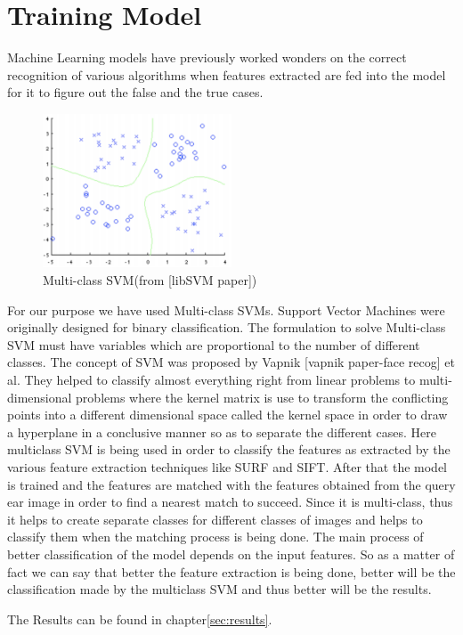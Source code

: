 \section{Training Model} \label{sec:build3} Machine Learning models have previously worked wonders on the correct recognition of various algorithms when features extracted are fed into the model for it to figure out the false and the true cases. 

\begin{figure}[b]
	\begin{center}
		\includegraphics[width=0.5\textwidth]{Figures/Figure10}
	\end{center}
	\caption{Multi-class SVM(from [libSVM paper])}
	\label{fig:Figure10}
\end{figure}


For our purpose we have used Multi-class SVMs. Support Vector Machines were originally designed for binary classification. The formulation to solve Multi-class SVM must have variables which are proportional to the number of different classes. The concept of SVM was proposed by Vapnik [vapnik paper-face recog] et al. They helped to classify almost everything right from linear problems to multi-dimensional problems where the kernel matrix is use to transform the conflicting points into a different dimensional space called the kernel space in order to draw a hyperplane in a conclusive manner so as to separate the different cases. Here multiclass SVM is being used in order to classify the features as extracted by the various feature extraction techniques like SURF and SIFT. After that the model is trained and the features are matched with the features obtained from the query ear image in order to find a nearest match to succeed. Since it is multi-class, thus it helps to create separate classes for different classes of images and helps to classify them when the matching process is being done. The main process of better classification of the model depends on the input features. So as a matter of fact we can say that better the feature extraction is being done, better will be the classification made by the multiclass SVM and thus better will be the results.

The Results can be found in chapter\ref{sec:results}.

